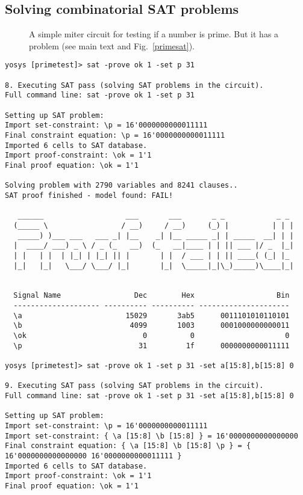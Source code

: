 \documentclass[9pt,technote,a4paper]{IEEEtran}
\begin{document}
\subsection{Solving combinatorial SAT problems}

\begin{figure}[b]

\caption{A simple miter circuit for testing if a number is prime. But it has a
problem (see main text and Fig.~\ref{primesat}).}
\label{primetest}
\end{figure}

\begin{figure*}[!t]
\begin{lstlisting}[basicstyle=\ttfamily\small]
yosys [primetest]> sat -prove ok 1 -set p 31

8. Executing SAT pass (solving SAT problems in the circuit).
Full command line: sat -prove ok 1 -set p 31

Setting up SAT problem:
Import set-constraint: \p = 16'0000000000011111
Final constraint equation: \p = 16'0000000000011111
Imported 6 cells to SAT database.
Import proof-constraint: \ok = 1'1
Final proof equation: \ok = 1'1

Solving problem with 2790 variables and 8241 clauses..
SAT proof finished - model found: FAIL!

   ______                   ___       ___       _ _            _ _
  (_____ \                 / __)     / __)     (_) |          | | |
   _____) )___ ___   ___ _| |__    _| |__ _____ _| | _____  __| | |
  |  ____/ ___) _ \ / _ (_   __)  (_   __|____ | | || ___ |/ _  |_|
  | |   | |  | |_| | |_| || |       | |  / ___ | | || ____( (_| |_
  |_|   |_|   \___/ \___/ |_|       |_|  \_____|_|\_)_____)\____|_|


  Signal Name                 Dec        Hex                   Bin
  -------------------- ---------- ---------- ---------------------
  \a                        15029       3ab5      0011101010110101
  \b                         4099       1003      0001000000000011
  \ok                           0          0                     0
  \p                           31         1f      0000000000011111

yosys [primetest]> sat -prove ok 1 -set p 31 -set a[15:8],b[15:8] 0

9. Executing SAT pass (solving SAT problems in the circuit).
Full command line: sat -prove ok 1 -set p 31 -set a[15:8],b[15:8] 0

Setting up SAT problem:
Import set-constraint: \p = 16'0000000000011111
Import set-constraint: { \a [15:8] \b [15:8] } = 16'0000000000000000
Final constraint equation: { \a [15:8] \b [15:8] \p } = { 16'0000000000000000 16'0000000000011111 }
Imported 6 cells to SAT database.
Import proof-constraint: \ok = 1'1
Final proof equation: \ok = 1'1


\end{lstlisting}
\end{figure*}
\end{document}
